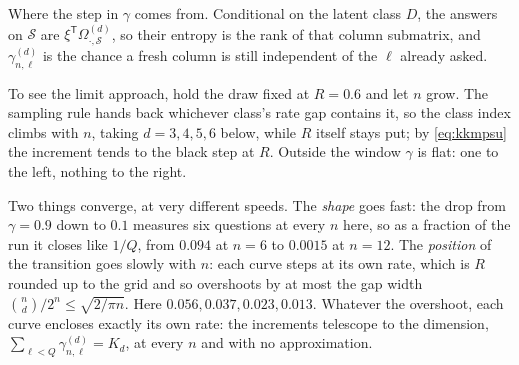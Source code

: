 \documentclass[11pt]{article}
\newif\ifdraftdata
\newcommand{\dataplot}[4]{%
  \ifdraftdata\else\addplot[#1] table[x=#2, y=#3] {#4};\fi}
\newcommand{\datalegend}[1]{\ifdraftdata\else\legend{#1}\fi}
\begin{document}
\begin{example}[label=ex:rmstep]
Where the step in $\gamma$ comes from. Conditional on the
latent class $D$, the answers on $\mathcal S$ are
$\xi^{\mathsf T}\Omega^{(d)}_{\cdot,\mathcal S}$, so their entropy is the rank
of that column submatrix, and $\gamma^{(d)}_{n,\ell}$ is the chance a
fresh column is still independent of the $\ell$ already asked. 

To see the limit approach, hold the draw fixed at $R = 0.6$ and let $n$ grow. 
The sampling rule hands back whichever class's rate gap contains it, so the class index
climbs with $n$, taking $d = 3, 4, 5, 6$ below, while $R$ itself stays
put; by \eqref{eq:kkmpsu} the increment tends to the black step at
$R$. Outside the window $\gamma$ is flat: one to the left, nothing to
the right.

\begin{center}
\end{center}

Two things converge, at very different speeds. The \emph{shape} goes
fast: the drop from $\gamma = 0.9$ down to $0.1$ measures six
questions at every $n$ here, so as a fraction of the run it closes like
$1/Q$, from $0.094$ at $n = 6$ to $0.0015$ at $n = 12$. The
\emph{position} of the transition goes slowly with $n$: each curve steps at its own rate, which is
$R$ rounded up to the grid and so overshoots by at most the gap width
$\binom nd/2^n \le \sqrt{2/\pi n}$. Here $0.056, 0.037, 0.023,
0.013$. Whatever the
overshoot, each curve encloses exactly its own rate: the increments
telescope to the dimension, $\sum_{\ell<Q}\gamma^{(d)}_{n,\ell} = K_d$,
at every $n$ and with no approximation.
\end{example}
\end{document}

